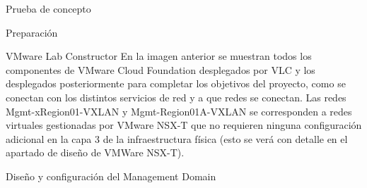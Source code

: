 \begin{section}{Prueba de concepto}
\begin{subsection}{Preparación}
\begin{subsubsection}{VMware Lab Constructor}
    En la imagen anterior se muestran todos los componentes de VMware Cloud Foundation desplegados por VLC y los desplegados posteriormente para completar los objetivos del proyecto, como se conectan con los distintos servicios de red y a que redes se conectan. Las redes Mgmt-xRegion01-VXLAN y Mgmt-Region01A-VXLAN se corresponden a redes virtuales gestionadas por VMware NSX-T que no requieren ninguna configuración adicional en la capa 3 de la infraestructura física (esto se verá con detalle en el apartado de diseño de VMWare NSX-T).
    \FloatBarrier
  \end{subsubsection}
  
\end{subsection}
\begin{subsection}{Diseño y configuración del Management Domain}
    
    
    
    

\end{subsection}
\end{section}
